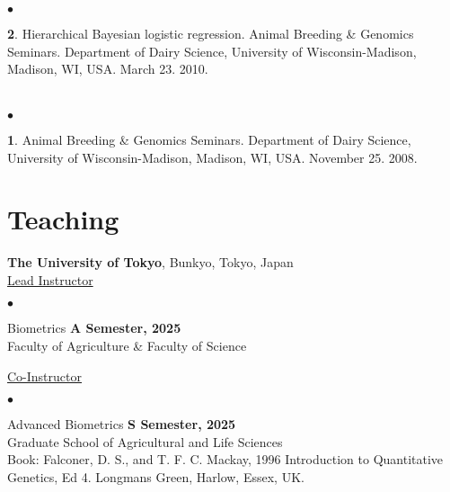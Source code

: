 \documentclass[margin,line,10pt]{res}
\newenvironment{list2}{
  \begin{list}{$\bullet$}{%
      \setlength{\itemsep}{0in}
      \setlength{\parsep}{0in} \setlength{\parskip}{0in}
      \setlength{\topsep}{0in} \setlength{\partopsep}{0in} 
      \setlength{\leftmargin}{0.2in}}}{\end{list}}
\begin{document}
\begin{resume}
\begin{list2}
\vspace{0.5cm}
\item [{\bf 2}.] Hierarchical Bayesian logistic regression. Animal Breeding \& Genomics Seminars. Department of Dairy Science, University of Wisconsin-Madison, Madison, WI, USA. March 23. 2010.
\end{list2}

\section{}
\begin{list2}
\item  [{\bf 1}.] Animal Breeding \& Genomics Seminars.  Department of Dairy Science, University of Wisconsin-Madison, Madison, WI, USA. November 25. 2008. 
\end{list2}




\vspace{0.5cm}
\section{\sc Teaching}
{\bf The University of Tokyo}, Bunkyo, Tokyo, Japan \vspace{0.2cm} \\
\underline{Lead Instructor} 
\vspace{0.4cm}
\begin{list2}
  \item Biometrics \hfill {\bf A Semester, 2025} \\ %
  Faculty of Agriculture \& Faculty of Science \\ %
\end{list2}


\vspace{0.4cm}
\underline{Co-Instructor} 
\vspace{0.4cm}


\begin{list2}
  \item Advanced Biometrics  \hfill {\bf S Semester, 2025} \\  %
  Graduate School of Agricultural and Life Sciences \\ %
  Book: Falconer, D. S., and T. F. C. Mackay, 1996 Introduction to Quantitative Genetics, Ed 4. Longmans Green, Harlow, Essex, UK.
 \end{list2}
 

\end{resume}
\end{document}
